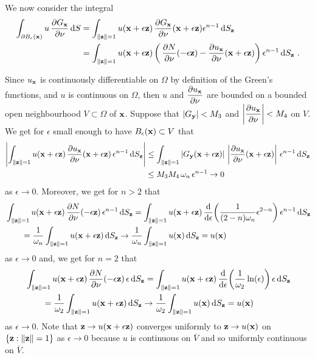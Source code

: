 We now consider the integral
\begin{align*}
\int_{\partial B_\epsilon(\mathbf{x})}
u\,\frac{\partial{G_{\mathbf{x}}}}{\partial \mathbf{\nu}} \,\mathrm{d}{S}
&=  \int_{\|\mathbf{z}\|=1} u(\mathbf{x}+\epsilon \mathbf{z})
\,\frac{\partial{G_{\mathbf{x}}}}{\partial \mathbf{\nu}}(\mathbf{x}+\epsilon \mathbf{z})
\epsilon^{n-1}\,\mathrm{d}{S}_{\mathbf{z}} \\
&= \int_{\|\mathbf{z}\|=1} u(\mathbf{x}+\epsilon \mathbf{z})
\left( \,\frac{\partial{N}}{\partial \mathbf{\nu}}(-\epsilon \mathbf{z})
- \frac{\partial{u_{\mathbf{x}}}}{\partial \mathbf{\nu}}(\mathbf{x}+\epsilon \mathbf{z}) \right)
\epsilon^{n-1}\,\mathrm{d}{S}_{\mathbf{z}} \ .
\end{align*}

Since $u_{\mathbf{x}}$ is continuously differentiable on $\Omega$ by
definition of the Green's functions, and $u$ is continuous
on $\Omega$, then $u$ and
$\displaystyle \frac{\partial{u_{\mathbf{x}}}}{\partial \mathbf{\nu}}$ are bounded on a
bounded open neighbourhood $V \subset \Omega$ of $\mathbf{x}$.  Suppose that
$|G_{\mathbf{y}}| < M_3$ and
$\displaystyle \left| \frac{\partial{u_{\mathbf{x}}}}{\partial \mathbf{\nu}}\right|< M_4$
on $V$.  We get for $\epsilon$
small enough to have $B_\epsilon(\mathbf{x}) \subset V$ that
\begin{align*}
\left| \int_{\|\mathbf{z}\|=1} u(\mathbf{x}+\epsilon \mathbf{z})
\,\frac{\partial{u_{\mathbf{x}}}}{\partial \mathbf{\nu}}(\mathbf{x}+\epsilon \mathbf{z})
\, \epsilon^{n-1} \,\mathrm{d}{S}_{\mathbf{z}} \right|
& \leq \int_{\|\mathbf{z}\|=1}
\left| G_{\mathbf{y}}(\mathbf{x} + \epsilon \mathbf{z}) \right|
\, \left|\frac{\partial{u_{\mathbf{x}}}}{\partial \mathbf{\nu}}(\mathbf{x}+\epsilon \mathbf{z})
\right| \, \epsilon^{n-1} \,\mathrm{d}{S}_{\mathbf{z}} \\
& \leq M_3 M_4\, \omega_n\, \epsilon^{n-1}  \to 0
\end{align*}
as $\epsilon \to 0$.  Moreover, we get for $n>2$ that
\begin{align*}
&\int_{\|\mathbf{z}\|=1}
u(\mathbf{x}+\epsilon \mathbf{z})
\,\frac{\partial{N}}{\partial \mathbf{\nu}}(-\epsilon \mathbf{z})\, \epsilon^{n-1}\,\mathrm{d}{S}_{\mathbf{z}}
= \int_{\|\mathbf{z}\|=1} u(\mathbf{x}+\epsilon \mathbf{z})
\,\frac{\mathrm{d}}{\mathrm{d}{\epsilon}}{ \left(\frac{1}{(2-n)\omega_n} \epsilon^{2-n}\right) }
\, \epsilon^{n-1}\,\mathrm{d}{S}_{\mathbf{z}} \\
&\qquad = \frac{1}{\omega_n} \int_{\|\mathbf{z}\|=1}
u(\mathbf{x}+\epsilon \mathbf{z}) \,\mathrm{d}{S}_{\mathbf{z}}
\to 
\frac{1}{\omega_n} \int_{\|\mathbf{z}\|=1} u(\mathbf{x}) \,\mathrm{d}{S}_{\mathbf{z}}
= u(\mathbf{x})
\end{align*}
as $\epsilon \to 0$ and, we get for $n=2$ that
\begin{align*}
&\int_{\|\mathbf{z}\|=1}
u(\mathbf{x}+\epsilon \mathbf{z})
\,\frac{\partial{N}}{\partial \mathbf{\nu}}(-\epsilon \mathbf{z})\, \epsilon \,\mathrm{d}{S}_{\mathbf{z}}
= \int_{\|\mathbf{z}\|=1} u(\mathbf{x}+\epsilon \mathbf{z})
\,\frac{\mathrm{d}}{\mathrm{d}{\epsilon}}{ \left(\frac{1}{\omega_2} \ln(\epsilon) \right) }
\, \epsilon \,\mathrm{d}{S}_{\mathbf{z}} \\
& \qquad = \frac{1}{\omega_2} \int_{\|\mathbf{z}\|=1}
u(\mathbf{x}+\epsilon \mathbf{z}) \,\mathrm{d}{S}_{\mathbf{z}}
\to
\frac{1}{\omega_2} \int_{\|\mathbf{z}\|=1} u(\mathbf{x}) \,\mathrm{d}{S}_{\mathbf{z}}
= u(\mathbf{x})
\end{align*}
as $\epsilon \to 0$. Note that $\mathbf{z} \to u(\mathbf{x}+\epsilon \mathbf{z})$
converges uniformly to $\mathbf{z} \to u(\mathbf{x})$ on
$\{ \mathbf{z} : \|\mathbf{z}\| = 1\}$ as $\epsilon \to 0$ because
$u$ is continuous on $\overline{V}$ and so uniformly continuous
on $\overline{V}$.

